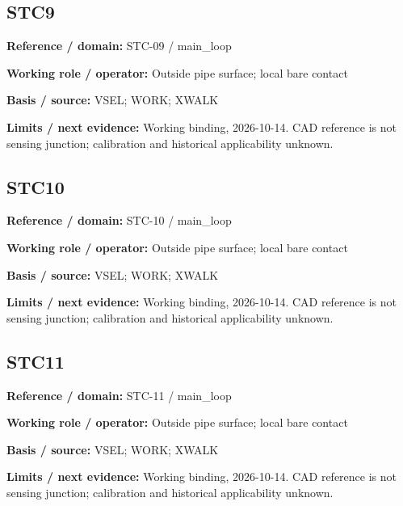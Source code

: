 \documentclass[11pt]{article}
\begin{document}
\par\noindent\begin{minipage}{\textwidth}\small\setlength{\parskip}{2pt}
\subsection*{STC9}
\textbf{Reference / domain:} STC-09 / main\_\allowbreak{}loop\par
\textbf{Working role / operator:} Outside pipe surface; local bare contact\par
\textbf{Basis / source:} VSEL; WORK; XWALK\par
\textbf{Limits / next evidence:} Working binding, 2026-10-14. CAD reference is not sensing junction; calibration and historical applicability unknown.\par
\end{minipage}\par\vspace{5pt}
\par\noindent\begin{minipage}{\textwidth}\small\setlength{\parskip}{2pt}
\subsection*{STC10}
\textbf{Reference / domain:} STC-10 / main\_\allowbreak{}loop\par
\textbf{Working role / operator:} Outside pipe surface; local bare contact\par
\textbf{Basis / source:} VSEL; WORK; XWALK\par
\textbf{Limits / next evidence:} Working binding, 2026-10-14. CAD reference is not sensing junction; calibration and historical applicability unknown.\par
\end{minipage}\par\vspace{5pt}
\par\noindent\begin{minipage}{\textwidth}\small\setlength{\parskip}{2pt}
\subsection*{STC11}
\textbf{Reference / domain:} STC-11 / main\_\allowbreak{}loop\par
\textbf{Working role / operator:} Outside pipe surface; local bare contact\par
\textbf{Basis / source:} VSEL; WORK; XWALK\par
\textbf{Limits / next evidence:} Working binding, 2026-10-14. CAD reference is not sensing junction; calibration and historical applicability unknown.\par
\end{minipage}\par\vspace{5pt}
\end{document}

